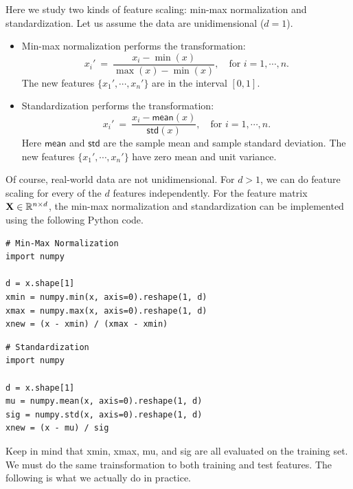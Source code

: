 \documentclass[11pt]{article}
\numberwithin{equation}{section}
\def\X{{\bf X}}
\def\RB{{\mathbb R}}
\def\mean{\mathsf{mean}}
\def\std{\mathsf{std}}
\begin{document}
Here we study two kinds of feature scaling: min-max normalization and standardization.
Let us assume the data are unidimensional ($d=1$).
\begin{itemize}
	\item 
	Min-max normalization performs the transformation:
	\begin{equation*}
	x_i' \: = \: \frac{ x_i - \min (x) }{ \max (x) - \min (x) },
	\quad \textrm{for } i = 1 , \cdots , n.
	\end{equation*}
	The new features $\{ x_1', \cdots , x_n' \}$ are in the interval $[0, 1]$.
	\item 
	Standardization performs the transformation:
	\begin{equation*}
	x_i' \: = \: \frac{ x_i - \mean (x) }{ \std (x) },
	\quad \textrm{for } i = 1 , \cdots , n.
	\end{equation*}
	Here $\mean $ and $\std $ are the sample mean and sample standard deviation.
	The new features $\{ x_1', \cdots , x_n' \}$ have zero mean and unit variance.
\end{itemize}
Of course, real-world data are not unidimensional.
For $d > 1$, we can do feature scaling for every of the $d$ features independently.
For the feature matrix $\X \in \RB^{n\times d}$, the min-max normalization and standardization can be implemented using the following Python code.

\vspace{3mm}
\begin{lstlisting}
# Min-Max Normalization
import numpy

d = x.shape[1]
xmin = numpy.min(x, axis=0).reshape(1, d)
xmax = numpy.max(x, axis=0).reshape(1, d)
xnew = (x - xmin) / (xmax - xmin)
\end{lstlisting}
\vspace{3mm}

\vspace{3mm}
\begin{lstlisting}
# Standardization
import numpy

d = x.shape[1]
mu = numpy.mean(x, axis=0).reshape(1, d)
sig = numpy.std(x, axis=0).reshape(1, d)
xnew = (x - mu) / sig
\end{lstlisting}
\vspace{3mm}


Keep in mind that \textsf{xmin}, \textsf{xmax}, \textsf{mu}, and \textsf{sig} are all evaluated on the training set.
We must do the same trainsformation to both training and test features.
The following is what we actually do in practice.
\end{document}
